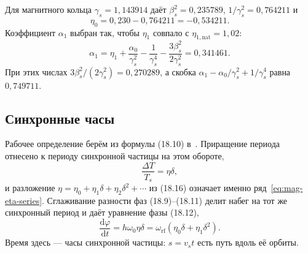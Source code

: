 \documentclass[aps,pra,preprint,a4paper,amsmath,amssymb,longbibliography]{revtex4-2}
\begin{document}
Для магнитного кольца $\gamma_s=1{,}143914$ даёт $\beta_s^2=0{,}235789$, $1/\gamma_s^2=0{,}764211$ и
\begin{equation}
\label{eq:mag-eta0-num}
\eta_0=0{,}230-0{,}764211=-0{,}534211.
\end{equation}
Коэффициент $\alpha_1$ выбран так, чтобы $\eta_1$ совпало с $\eta_{1,\mathrm{nat}}=1{,}02$:
\begin{equation}
\label{eq:mag-alpha1-num}
\alpha_1
=\eta_1+\frac{\alpha_0}{\gamma_s^2}-\frac{1}{\gamma_s^4}-\frac{3\beta_s^2}{2\gamma_s^2}
=0{,}341461.
\end{equation}
При этих числах $3\beta_s^2/(2\gamma_s^2)=0{,}270289$, а скобка $\alpha_1-\alpha_0/\gamma_s^2+1/\gamma_s^4$ равна $0{,}749711$.

\subsection{Синхронные часы}
\label{sec:clocks}

Рабочее определение берём из формулы (18.10) в~\cite{Ng2006}. Приращение периода отнесено к периоду синхронной частицы на этом обороте,
\begin{equation}
\label{eq:mag-ng1810}
\frac{\Delta T}{T_s}=\eta\delta,
\end{equation}
и разложение $\eta=\eta_0+\eta_1\delta+\eta_2\delta^2+\cdots$ из (18.16) означает именно ряд~\eqref{eq:mag-eta-series}. Сглаживание разности фаз (18.9)--(18.11) делит набег на тот же синхронный период и даёт уравнение фазы (18.12),
\begin{equation}
\label{eq:mag-phase-slip}
\frac{\mathrm{d}\varphi}{\mathrm{d}t}=h\omega_0\eta\delta
=\omega_{\mathrm{rf}}(\eta_0\delta+\eta_1\delta^2).
\end{equation}
Время здесь --- часы синхронной частицы: $s=v_s t$ есть путь вдоль её орбиты.
\end{document}
